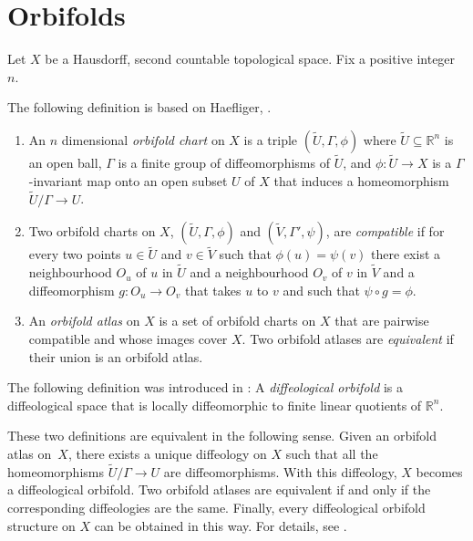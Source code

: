 \documentclass[pdftex]{sigma}
\numberwithin{equation}{section}
\newcommand{\RR}{{\mathbb{R}}} %
\begin{document}
\appendix
\section{Orbifolds}\label{sec:orbifolds}


Let $X$ be a Hausdorf\/f, second countable topological space.
Fix a positive integer $n$.

The following def\/inition is based on Haef\/liger, \cite[Section~4]{haefliger}.

\begin{enumerate}\itemsep=0pt
\item
An $n$ dimensional \emph{orbifold chart} on $X$ is a triple
$(\tilde{U},\Gamma,\phi)$ where $\tilde{U}\subseteq\RR^n$ is an open ball,
$\Gamma$ is a f\/inite group of dif\/feomorphisms of $\tilde{U}$,
and $\phi \colon \tilde{U}\to X$ is a $\Gamma$-invariant map
onto an open subset $U$ of $X$
that induces a homeomorphism $\tilde{U}/\Gamma \to U$.

\item
Two orbifold charts on $X$,
$(\tilde{U},\Gamma,\phi)$ and $(\tilde{V},\Gamma',\psi)$,
are \emph{compatible}
if for every two points $u \in \tilde{U}$ and $v \in \tilde{V}$
such that $\phi(u) = \psi(v)$ there exist
a neighbourhood $O_u$ of $u$ in $\tilde{U}$
and a neighbourhood $O_v$ of $v$ in $\tilde{V}$
and a dif\/feomorphism $g \colon O_u \to O_v$
that takes $u$ to $v$ and such that $\psi \circ g = \phi$.

\item {}
An \emph{orbifold atlas} on $X$ is a set of orbifold charts on $X$
that are pairwise compatible and whose images cover $X$.
Two orbifold atlases are \emph{equivalent} if their union is an orbifold atlas.
\end{enumerate}

The following def\/inition was introduced in \cite{IZKZ}:
A \emph{diffeological orbifold} is a dif\/feological space
that is locally dif\/feomorphic to f\/inite linear quotients of $\RR^n$.

These two def\/initions are equivalent in the following sense.
Given an orbifold atlas on~$X$, there exists a unique dif\/feology on $X$
such that all the homeomorphisms $\tilde{U}/\Gamma \to U$
are dif\/feomor\-phisms. With this dif\/feology, $X$ becomes a dif\/feological
orbifold. Two orbifold atlases are equivalent if and only if
the corresponding dif\/feologies are the same.
Finally, every dif\/feological orbifold structure on $X$
can be obtained in this way.
For details, see \cite[Section~8]{IZKZ}.
\end{document}
